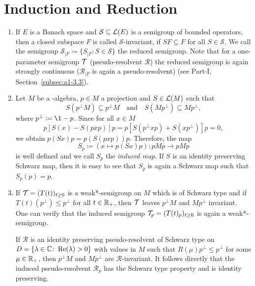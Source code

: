\section{Induction and Reduction}\label{sec:d1-3}
\begin{enumerate}[1., wide, labelindent=.25em]
\item
If\/ $ E $ is a Banach space and $ \mathcal{S} \subseteq \mathcal{L}(E) $ is a semigroup of bounded operators, then a closed subspace $ F $ is called $ \mathcal{S} $-invariant, if\/ $ SF \subseteq F $ for all $ S \in \mathcal{S} $.
We call the semigroup $ \mathcal{S}_{\vert F} \coloneq \{S_{\vert F} \colon S \in \mathcal{S} \} $ the reduced semigroup.
Note that for a one-parameter semigroup $ \mathcal{T} $ (\resp pseudo-resolvent $ \mathcal{R} $) the reduced semigroup is again strongly continuous (\resp $ \mathcal{R}_{\vert F} $ is again a pseudo-resolvent) (see Part-I, Section~\ref{subsec:a1-3.3}).

\item\label{item:d1-3.2}
Let $ M $ be a \WA-algebra, $ p \in M $ a projection and $ S \in \mathcal{L}(M) $ such that 
%
\[
	S( p^{\perp}M ) \subseteq p^{\perp}M 
	\quad \text{and} \quad 
	S( Mp^{\perp}) \subseteq Mp^{\perp} ,  
\]
%
where $ p^{\perp} \coloneq \1-p $.
Since for all $ x \in M $
\[
p[S(x) - S(pxp)]p = p[S(p^{\perp}xp) + S(xp^{\perp})]p = 0,
\]
we obtain $ p(Sx)p = p(S(pxp))p $.
Therefore, the map
\[
S_{p} \coloneq (x \mapsto p(Sx)p) \colon pMp \to pMp
\]
is well defined and we call $ S_{p} $ the \emph{induced map}.
If\/ $ S $ is an identity preserving Schwarz map, then it is easy to see that $ S_{p} $ is again a Schwarz map such that $ S_{p}(p) = p $.

\item
If\/ $ \TT = (T(t))_{t\geq0} $ is a weak*-semigroup on $ M $ which is of Schwarz type and if\/ $ T(t)(p^{\perp}) \leq p^{\perp} $ for all $ t \in \mathbb{R}_{+} $, then $ \mathcal{T} $ leaves $ p^{\perp}M $ and $ Mp^{\perp} $ invariant.
One can verify that the induced semigroup $\TT_p = (T(t)_{p})_{t \geq 0}$ is again a weak*-semigroup.

If  $ \mathcal{R} $ is an identity preserving pseudo-resolvent of Schwarz type on $ D = \{\lambda \in \mathbb{C} \colon \mathop{}\!\mathrm{Re}(\lambda) > 0\} $ with values in $ M $ such that $ R(\mu)p^{\perp} \leq p^{\perp} $ for some $ \mu \in \mathbb{R}_{+} $, then $ p^{\perp}M $ and $ Mp^{\perp} $ are  $ \mathcal{R} $-invariant.
It follows directly that the induced pseudo-resolvent $ \mathcal{R}_p$ has the Schwarz type property and is identity preserving.


\end{enumerate}

